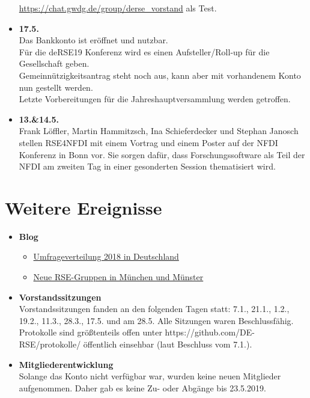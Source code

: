 \begin{itemize}
  \href{https://chat.gwdg.de/group/derse_vorstand}{https://chat.gwdg.de/group/derse\_vorstand} als Test.
 \item \textbf{17.5.}\\
  Das Bankkonto ist eröffnet und nutzbar.\\
  Für die deRSE19 Konferenz wird es einen Aufsteller/Roll-up für die Gesellschaft geben.\\
  Gemeinnützigkeitsantrag steht noch aus, kann aber mit vorhandenem Konto nun gestellt werden.\\
  Letzte Vorbereitungen für die Jahreshauptversammlung werden getroffen.
 \item \textbf{13.\&14.5.}\\
  Frank Löffler, Martin Hammitzsch, Ina Schieferdecker und Stephan Janosch stellen RSE4NFDI mit einem Vortrag und einem Poster auf der NFDI Konferenz in Bonn vor. Sie sorgen dafür, dass Forschungssoftware als Teil der NFDI am zweiten Tag in einer gesonderten Session thematisiert wird.
\end{itemize}

\section{Weitere Ereignisse}

\begin{itemize}
 \item \textbf{Blog}
 \begin{itemize}
  \item \href{https://www.de-rse.org/blog/2019/01/29/umfrageverteilung-2018-in-deutschland.html}{Umfrageverteilung 2018 in Deutschland}
  \item \href{https://www.de-rse.org/blog/2019/02/26/new-rse-groups-meet-in-munich-and-muenster.html}{Neue RSE-Gruppen in München und Münster}
 \end{itemize}
 \item \textbf{Vorstandssitzungen}\\
  Vorstandssitzungen fanden an den folgenden Tagen statt: 7.1., 21.1., 1.2., 19.2., 11.3., 28.3., 17.5. und am 28.5. Alle Sitzungen waren Beschlussfähig. Protokolle sind größtenteils offen unter https://github.com/DE-RSE/protokolle/ öffentlich einsehbar (laut Beschluss vom 7.1.).
 \item \textbf{Mitgliederentwicklung}\\
  Solange das Konto nicht verfügbar war, wurden keine neuen Mitglieder aufgenommen. Daher gab es keine Zu- oder Abgänge bis 23.5.2019.
\end{itemize}

